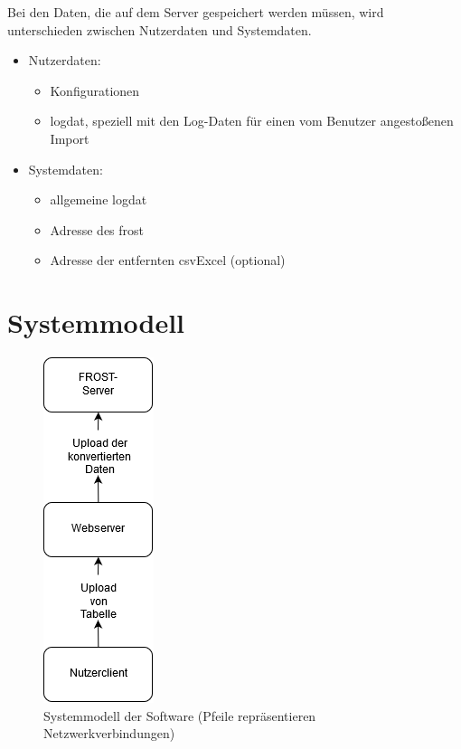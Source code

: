 \documentclass[a4paper, 12 pt]{article}
\begin{document}
	Bei den Daten, die auf dem Server gespeichert werden müssen, wird unterschieden zwischen Nutzerdaten und Systemdaten.
	
\begin{itemize}
	\item Nutzerdaten:
	\begin{itemize}
		\item Konfigurationen
		\item \gls{logdat}, speziell mit den Log-Daten für einen vom Benutzer angestoßenen Import
	\end{itemize}
	\item Systemdaten:
	\begin{itemize}
		\item allgemeine \gls{logdat}
		\item Adresse des \gls{frost}
		\item Adresse der entfernten \gls{csvExcel} (optional) 
	\end{itemize}
\end{itemize}

\newpage
\section{Systemmodell}
	\begin{figure}[htbp]
	\centering
	\includegraphics[scale=1]{images/sysmodel}
	\caption{\label{fig:system}Systemmodell der Software (Pfeile repräsentieren Netzwerkverbindungen)}
	\end{figure}	
	
\end{document}
